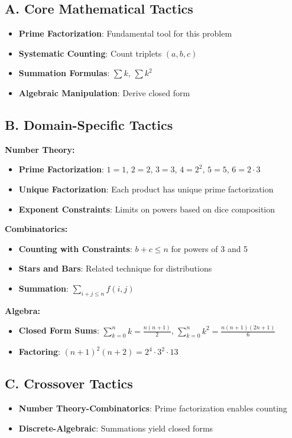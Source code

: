 \documentclass[12pt]{article}
\begin{document}
\begin{tacticalbox}
\subsection*{A. Core Mathematical Tactics}
\begin{itemize}[leftmargin=*]
    \item \textbf{Prime Factorization}: Fundamental tool for this problem
    \item \textbf{Systematic Counting}: Count triplets $(a, b, c)$
    \item \textbf{Summation Formulas}: $\sum k$, $\sum k^2$
    \item \textbf{Algebraic Manipulation}: Derive closed form
\end{itemize}

\subsection*{B. Domain-Specific Tactics}

\textbf{Number Theory:}
\begin{itemize}[leftmargin=*]
    \item \textbf{Prime Factorization}: $1=1$, $2=2$, $3=3$, $4=2^2$, $5=5$, $6=2 \cdot 3$
    \item \textbf{Unique Factorization}: Each product has unique prime factorization
    \item \textbf{Exponent Constraints}: Limits on powers based on dice composition
\end{itemize}

\textbf{Combinatorics:}
\begin{itemize}[leftmargin=*]
    \item \textbf{Counting with Constraints}: $b + c \leq n$ for powers of 3 and 5
    \item \textbf{Stars and Bars}: Related technique for distributions
    \item \textbf{Summation}: $\sum_{i+j \leq n} f(i,j)$
\end{itemize}

\textbf{Algebra:}
\begin{itemize}[leftmargin=*]
    \item \textbf{Closed Form Sums}: $\sum_{k=0}^n k = \frac{n(n+1)}{2}$, $\sum_{k=0}^n k^2 = \frac{n(n+1)(2n+1)}{6}$
    \item \textbf{Factoring}: $(n+1)^2(n+2) = 2^4 \cdot 3^2 \cdot 13$
\end{itemize}

\subsection*{C. Crossover Tactics}
\begin{itemize}[leftmargin=*]
    \item \textbf{Number Theory-Combinatorics}: Prime factorization enables counting
    \item \textbf{Discrete-Algebraic}: Summations yield closed forms
\end{itemize}
\end{tacticalbox}
\end{document}
